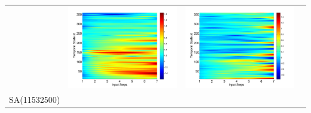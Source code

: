 \documentclass[draft,wrr]{AGUTeX}
\begin{document}
\begin{article}
\begin{table}[H]
\begin{tabular}{cccc}
&\begin{minipage}{.3\textwidth}\includegraphics[width=\linewidth]{resultgraph/05585000diff_ep.png}\end{minipage}
&\begin{minipage}{.3\textwidth}\includegraphics[width=\linewidth]{resultgraph/05585000diff_q.png}\end{minipage}
\\
SA(11532500)

\end{tabular}
\end{table}
\end{article}
\end{document}
